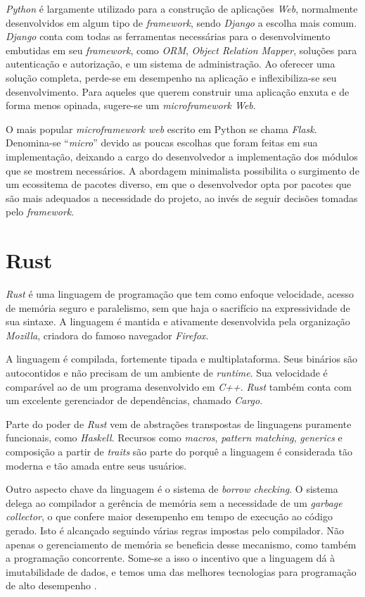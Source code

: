   \emph{Python} é largamente utilizado para a construção de aplicações \emph{Web}, normalmente 
  desenvolvidos em algum tipo de \emph{framework}, sendo \emph{Django} a escolha mais comum.
  \emph{Django} conta com todas as ferramentas necessárias para o desenvolvimento 
  embutidas em seu \emph{framework}, como \emph{ORM}, \emph{Object Relation Mapper}, 
  soluções para autenticação e autorização, e um sistema de administração. Ao oferecer
  uma solução completa, perde-se em desempenho na aplicação e inflexibiliza-se seu 
  desenvolvimento. Para aqueles 
  que querem construir uma aplicação enxuta e de forma menos opinada, sugere-se um
  \emph{microframework Web}. 

  O mais popular \emph{microframework web} escrito em Python se chama \emph{Flask}.
  Denomina-se ``\emph{micro}'' devido as poucas escolhas que foram feitas 
  em sua implementação,
  deixando a cargo do desenvolvedor a implementação dos módulos que se mostrem 
  necessários. A abordagem minimalista possibilita o surgimento de um ecossitema de 
  pacotes diverso, em que o desenvolvedor opta por pacotes que são mais adequados a 
  necessidade do projeto, ao invés de seguir decisões tomadas pelo \emph{framework}.
\section{Rust}
\emph{Rust} é uma linguagem de programação que tem como enfoque velocidade, acesso de memória 
seguro e paralelismo, sem que haja o sacrifício na expressividade de sua sintaxe. A linguagem 
é mantida e ativamente desenvolvida pela organização \emph{Mozilla}, criadora do famoso navegador 
\emph{Firefox}. 

A linguagem é compilada, fortemente tipada  e multiplataforma. Seus binários são autocontidos e não  precisam de um ambiente de \emph{runtime}. Sua velocidade é comparável ao de um programa desenvolvido em \emph{C++}.  \emph{Rust} também conta com um excelente 
gerenciador de dependências, chamado \emph{Cargo}. 

Parte do poder de \emph{Rust} vem de abstrações transpostas de linguagens puramente funcionais, como 
\emph{Haskell}. Recursos como \emph{macros}, \emph{pattern matching}, \emph{generics} e composição a partir 
de \emph{traits} são parte do porquê a linguagem é considerada tão moderna e tão amada entre seus usuários.

Outro aspecto chave da linguagem é o sistema de \emph{borrow checking}. O sistema delega ao compilador a gerência de memória sem a necessidade de um \emph{garbage collector}, o que confere maior desempenho em
tempo de execução ao código gerado. Isto é alcançado seguindo várias regras impostas pelo compilador.
Não apenas o gerenciamento de memória se beneficia desse mecanismo,
como também a programação concorrente.
Some-se a isso o incentivo que a linguagem dá à imutabilidade de dados,
e temos uma das melhores tecnologias para programação de alto desempenho \cite{klabnik2018rust}.  

